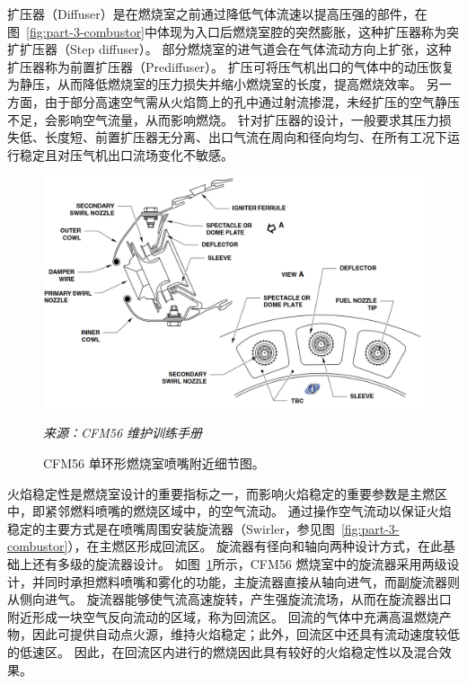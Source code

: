 扩压器（Diffuser）是在燃烧室之前通过降低气体流速以提高压强的部件，在图~\ref{fig:part-3-combustor}中体现为入口后燃烧室腔的突然膨胀，这种扩压器称为突扩扩压器（Step diffuser）。
部分燃烧室的进气道会在气体流动方向上扩张，这种扩压器称为前置扩压器（Prediffuser）。
扩压可将压气机出口的气体中的动压恢复为静压，从而降低燃烧室的压力损失并缩小燃烧室的长度，提高燃烧效率。
另一方面，由于部分高速空气需从火焰筒上的孔中通过射流掺混，未经扩压的空气静压不足，会影响空气流量，从而影响燃烧。
针对扩压器的设计，一般要求其压力损失低、长度短、前置扩压器无分离、出口气流在周向和径向均匀、在所有工况下运行稳定且对压气机出口流场变化不敏感。

\begin{figure}[!ht]
    \centering
    \includegraphics[width=0.8\linewidth]{combustor-nozzle.png}
    \caption{CFM56 单环形燃烧室喷嘴附近细节图。}
    \label{fig:part-3-combustor-nozzle}
    \textit{\small 来源：CFM56 维护训练手册}
\end{figure}

火焰稳定性是燃烧室设计的重要指标之一，而影响火焰稳定的重要参数是主燃区中，即紧邻燃料喷嘴的燃烧区域中，的空气流动。
通过操作空气流动以保证火焰稳定的主要方式是在喷嘴周围安装旋流器（Swirler，参见图~\ref{fig:part-3-combustor}），在主燃区形成回流区。
旋流器有径向和轴向两种设计方式，在此基础上还有多级的旋流器设计。
如图~\ref{fig:part-3-combustor-nozzle}所示，CFM56 燃烧室中的旋流器采用两级设计，并同时承担燃料喷嘴和雾化的功能，主旋流器直接从轴向进气，而副旋流器则从侧向进气。
旋流器能够使气流高速旋转，产生强旋流流场，从而在旋流器出口附近形成一块空气反向流动的区域，称为回流区。
回流的气体中充满高温燃烧产物，因此可提供自动点火源，维持火焰稳定；此外，回流区中还具有流动速度较低的低速区。
因此，在回流区内进行的燃烧因此具有较好的火焰稳定性以及混合效果。

